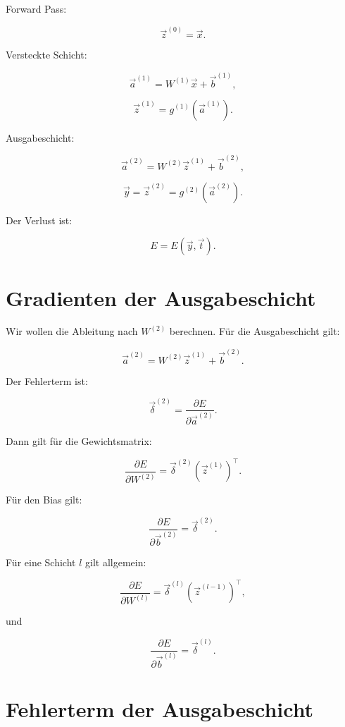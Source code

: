 Forward Pass:

\[
    \vec{z}^{(0)}
    =
    \vec{x}.
\]

Versteckte Schicht:

\[
    \vec{a}^{(1)}
    =
    W^{(1)}\vec{x}
    +
    \vec{b}^{(1)},
\]

\[
    \vec{z}^{(1)}
    =
    g^{(1)}(\vec{a}^{(1)}).
\]

Ausgabeschicht:

\[
    \vec{a}^{(2)}
    =
    W^{(2)}\vec{z}^{(1)}
    +
    \vec{b}^{(2)},
\]

\[
    \vec{y}
    =
    \vec{z}^{(2)}
    =
    g^{(2)}(\vec{a}^{(2)}).
\]

Der Verlust ist:

\[
    E
    =
    E(\vec{y},\vec{t}).
\]

\section{Gradienten der Ausgabeschicht}

Wir wollen die Ableitung nach \(W^{(2)}\) berechnen.
Für die Ausgabeschicht gilt:

\[
    \vec{a}^{(2)}
    =
    W^{(2)}\vec{z}^{(1)}
    +
    \vec{b}^{(2)}.
\]

Der Fehlerterm ist:

\[
    \vec{\delta}^{(2)}
    =
    \frac{\partial E}{\partial \vec{a}^{(2)}}.
\]

Dann gilt für die Gewichtsmatrix:

\[
    \frac{\partial E}{\partial W^{(2)}}
    =
    \vec{\delta}^{(2)}
    (\vec{z}^{(1)})^{\top}.
\]

Für den Bias gilt:

\[
    \frac{\partial E}{\partial \vec{b}^{(2)}}
    =
    \vec{\delta}^{(2)}.
\]

\begin{definitionbox}
Für eine Schicht \(l\) gilt allgemein:

\[
    \frac{\partial E}{\partial W^{(l)}}
    =
    \vec{\delta}^{(l)}
    (\vec{z}^{(l-1)})^{\top},
\]

und

\[
    \frac{\partial E}{\partial \vec{b}^{(l)}}
    =
    \vec{\delta}^{(l)}.
\]
\end{definitionbox}

\section{Fehlerterm der Ausgabeschicht}

